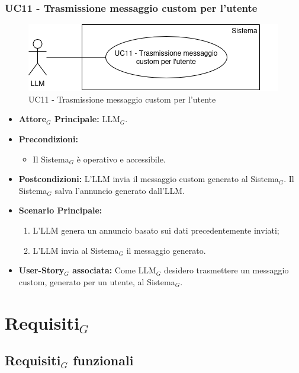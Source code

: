 \documentclass[10pt]{article}
\begin{document}
\begin{justify}
\subsubsection{\textbf{UC11 - Trasmissione messaggio custom per l'utente}}
\begin{figure}[H]
    \centering
    \includegraphics[width=0.7\linewidth]{UC11image.png}
    \caption{UC11 - Trasmissione messaggio custom per l'utente}
    \label{fig:UC11}
\end{figure}
\label{UC11}
\begin{itemize}
    \item \textbf{Attore$_G$ Principale:} LLM$_G$.
    \item \textbf{Precondizioni:} 
        \begin{itemize}
          \item Il Sistema$_G$ è operativo e accessibile.
        \end{itemize}
      \item \textbf{Postcondizioni:} L'LLM invia il messaggio custom generato al Sistema$_G$. Il Sistema$_G$ salva l'annuncio generato dall'LLM.
    \item \textbf{Scenario Principale:} 
        \begin{enumerate}
        \item L'LLM genera un annuncio basato sui dati precedentemente inviati;
        \item L'LLM invia al Sistema$_G$ il messaggio generato. 
        \end{enumerate}
    \item \textbf{User-Story$_G$ associata:} Come LLM$_G$ desidero trasmettere un messaggio custom, generato per un utente, al Sistema$_G$.
\end{itemize}


\newpage
\section{Requisiti$_G$}

\subsection{Requisiti$_G$ funzionali}


\end{justify}
\end{document}
